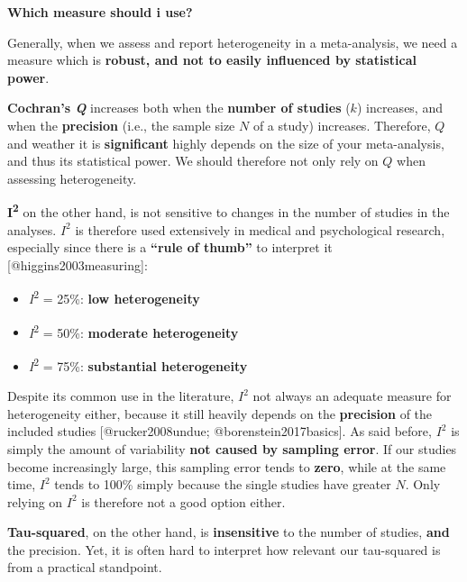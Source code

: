 \documentclass[]{book}
\providecommand{\tightlist}{%
  \setlength{\itemsep}{0pt}\setlength{\parskip}{0pt}}
\begin{document}
\begin{rmdachtung}
\textbf{Which measure should i use?}

Generally, when we assess and report heterogeneity in a meta-analysis,
we need a measure which is \textbf{robust, and not to easily influenced
by statistical power}.

\textbf{Cochran's \emph{Q} } increases both when the \textbf{number of
studies} (\(k\)) increases, and when the \textbf{precision} (i.e., the
sample size \(N\) of a study) increases. Therefore, \(Q\) and weather it
is \textbf{significant} highly depends on the size of your
meta-analysis, and thus its statistical power. We should therefore not
only rely on \(Q\) when assessing heterogeneity.

\textbf{I\textsuperscript{2}} on the other hand, is not sensitive to
changes in the number of studies in the analyses. \(I^2\) is therefore
used extensively in medical and psychological research, especially since
there is a \textbf{``rule of thumb''} to interpret it
{[}@higgins2003measuring{]}:

\begin{itemize}
\tightlist
\item
  \emph{I}\textsuperscript{2} = 25\%: \textbf{low heterogeneity}
\item
  \emph{I}\textsuperscript{2} = 50\%: \textbf{moderate heterogeneity}
\item
  \emph{I}\textsuperscript{2} = 75\%: \textbf{substantial heterogeneity}
\end{itemize}

Despite its common use in the literature, \(I^2\) not always an adequate
measure for heterogeneity either, because it still heavily depends on
the \textbf{precision} of the included studies {[}@rucker2008undue;
@borenstein2017basics{]}. As said before, \(I^{2}\) is simply the amount
of variability \textbf{not caused by sampling error}. If our studies
become increasingly large, this sampling error tends to \textbf{zero},
while at the same time, \(I^{2}\) tends to 100\% simply because the
single studies have greater \(N\). Only relying on \(I^2\) is therefore
not a good option either.

\textbf{Tau-squared}, on the other hand, is \textbf{insensitive} to the
number of studies, \textbf{and} the precision. Yet, it is often hard to
interpret how relevant our tau-squared is from a practical standpoint.


\end{rmdachtung}
\end{document}
